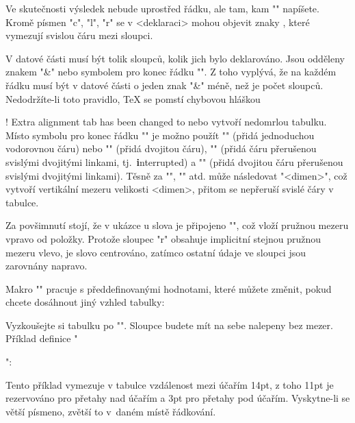 \medskip
\hfil{}
\medskip

Ve skutečnosti výsledek nebude uprostřed řádku, ale tam, kam "\table"
napíšete. Kromě písmen "c", "l", "r" se v <deklaraci> mohou objevit znaky
, které vymezují svislou čáru mezi sloupci. 

V datové části musí být tolik sloupců, kolik jich bylo deklarováno.
Jsou odděleny znakem "&" nebo symbolem pro konec řádku "\cr". Z toho vyplývá,
že na každém řádku musí být v datové části o jeden znak "&" méně, než je počet sloupců.
Nedodržíte-li toto pravidlo, \TeX{} se pomstí chybovou hláškou

\begtt
! Extra alignment tab has been changed to \cr
\endtt  
%
nebo vytvoří nedomrlou tabulku. Místo symbolu pro konec řádku "\cr" je možno
použít "\crl" (přidá jednoduchou vodorovnou čáru) nebo "\crll" (přidá dvojitou
čáru), "\crli" (přidá čáru přerušenou svislými dvojitými linkami, 
tj.~{\bf i}nterrupted) a 
"\crlli" (přidá dvojitou čáru přerušenou svislými dvojitými linkami).
Těsně za "\cr", "\crl" atd. může následovat "\tskip<dimen>",
což vytvoří vertikální mezeru velikosti <dimen>, přitom se nepřeruší svislé
čáry v tabulce.

Za povšimnutí stojí, že v ukázce u slova  je připojeno
"\hfil", což vloží pružnou mezeru vpravo od položky. Protože sloupec "r"
obsahuje implicitní stejnou pružnou mezeru vlevo, je slovo  centrováno, 
zatímco ostatní údaje ve sloupci jsou zarovnány
napravo. 

Makro "\table" pracuje s předdefinovanými hodnotami, které můžete změnit,
pokud chcete dosáhnout jiný vzhled tabulky:

\begtt
\def\tabiteml{\enspace} %
\def\tabitemr{\enspace} %
\def\tabstrut{\strut}   %
\def\vvkern{1pt}   %
\def\hhkern{1pt}   %
\endtt

Vyzkoušejte si tabulku po "\def\tabiteml{}\def\tabitemr{}". Sloupce budete
mít na sebe nalepeny bez mezer. Příklad definice "\tabstrut": 

\begtt
\def\tabstrut{\vrule height11pt depth3pt width0pt}
\endtt
%
Tento příklad vymezuje v tabulce vzdálenost mezi účařím 14pt, z toho
11pt je rezervováno pro přetahy nad účařím a 3pt pro přetahy pod
účařím. Vyskytne-li se větší písmeno, zvětší to v~daném místě řádkování.

